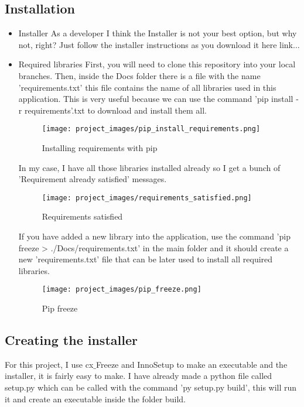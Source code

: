 \subsection{Installation}
\begin{itemize}
\item Installer
\newline As a developer I think the Installer is not your best option, but why not, right? Just follow the installer instructions as you download it here link...
\item Required libraries
\newline First, you will need to clone this repository into your local branches. Then, inside the Docs folder there is a file with the name 'requirements.txt' this file contains the name of all libraries used in this application. This is very useful because we can use the command 'pip install -r requirements'.txt to download and install them all.

\begin{figure}[H]
\centering
\texttt{[image: project\_images/pip\_install\_requirements.png]}
 \caption{Installing requirements with pip}
 \label{fig:pip install requirements}
\end{figure}

In my case, I have all those libraries installed already so I get a bunch of 'Requirement already satisfied' messages.

\begin{figure}[H]
\centering
\texttt{[image: project\_images/requirements\_satisfied.png]}
 \caption{Requirements satisfied}
 \label{fig:requirements satisfied}
\end{figure}

If you have added a new library into the application, use the command 'pip freeze > ./Docs/requirements.txt' in the main folder and it should create a new 'requirements.txt' file that can be later used to install all required libraries.

\begin{figure}[H]
\centering
\texttt{[image: project\_images/pip\_freeze.png]}
 \caption{Pip freeze}
 \label{fig:pip freeze}
\end{figure}	
\end{itemize}

\subsection{Creating the installer}
	For this project, I use cx$\_$Freeze and InnoSetup to make an executable and the installer, it is fairly easy to make. I have already made a python file called setup.py which can be called with the command 'py setup.py build', this will run it and create an executable inside the folder build.

